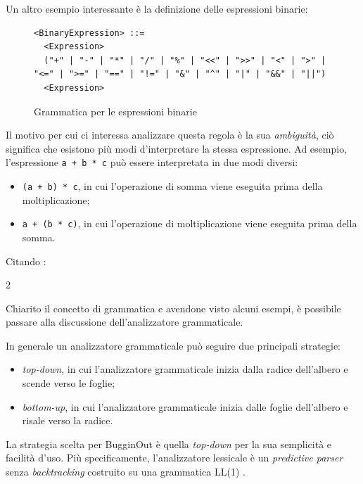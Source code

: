 Un altro esempio interessante \`e la definizione delle espressioni binarie:
\begin{figure}[H]
	\centering
	\begin{verbatim}
<BinaryExpression> ::=
  <Expression>
  ("+" | "-" | "*" | "/" | "%" | "<<" | ">>" | "<" | ">" | "<=" | ">=" | "==" | "!=" | "&" | "^" | "|" | "&&" | "||")
  <Expression>
	\end{verbatim}
	\label{fig:bugginout-binary-expression}
	\caption{Grammatica per le espressioni binarie}
\end{figure}

Il motivo per cui ci interessa analizzare questa regola \`e la sua \emph{ambiguit\`a}, ci\`o significa che esistono pi\`u modi d'interpretare la stessa espressione. Ad esempio, l'espressione \texttt{a + b * c} pu\`o essere interpretata in due modi diversi:
\begin{itemize}
	\item \texttt{(a + b) * c}, in cui l'operazione di somma viene eseguita prima della moltiplicazione;
	\item \texttt{a + (b * c)}, in cui l'operazione di moltiplicazione viene eseguita prima della somma.
\end{itemize}
Citando \cite{alfred2007compilers}:
\begin{parcolumns}[colwidths={1=0.44\textwidth,2=0.44\textwidth},rulebetween=true,nofirstindent=true,sloppy=true]{2}
	\colplacechunks
\end{parcolumns}

Chiarito il concetto di grammatica e avendone visto alcuni esempi, \`e possibile passare alla discussione dell'analizzatore grammaticale.

In generale un analizzatore grammaticale pu\`o seguire due principali strategie:
\begin{itemize}
	\item \emph{top-down}, in cui l'analizzatore grammaticale inizia dalla radice dell'albero e scende verso le foglie;
	\item \emph{bottom-up}, in cui l'analizzatore grammaticale inizia dalle foglie dell'albero e risale verso la radice.
\end{itemize}
La strategia scelta per BugginOut \`e quella \emph{top-down} per la sua semplicit\`a e facilit\`a d'uso. Pi\`u specificamente, l'analizzatore lessicale \`e un \textit{predictive parser} senza \textit{backtracking} costruito su una grammatica LL(1) \cite{alfred2007compilers}.

